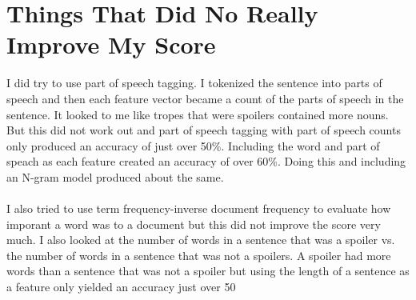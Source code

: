 \documentclass[11pt]{article}
\begin{document}
\section*{Things That Did No Really Improve My Score}
I did try to use part of speech tagging.  I tokenized the sentence into parts of speech and then each feature vector became a count of the parts of speech in the sentence.  It looked to me like tropes that were spoilers contained more nouns.  But this did not work out and part of speech tagging with part of speech counts only produced an accuracy of just over 50\%.  Including the word and part of speach as each feature created an accuracy of over 60\%.  Doing this and including an N-gram model produced about the same.
\\ \\
I also tried to use term frequency-inverse document frequency to evaluate how imporant a word was to a document but this did not improve the score very much.  I also looked at the number of words in a sentence that was a spoiler vs. the number of words in a sentence that was not a spoilers.  A spoiler had more words than a sentence that was not a spoiler but using the length of a sentence as a feature only yielded an accuracy just over 50%
\end{document}
